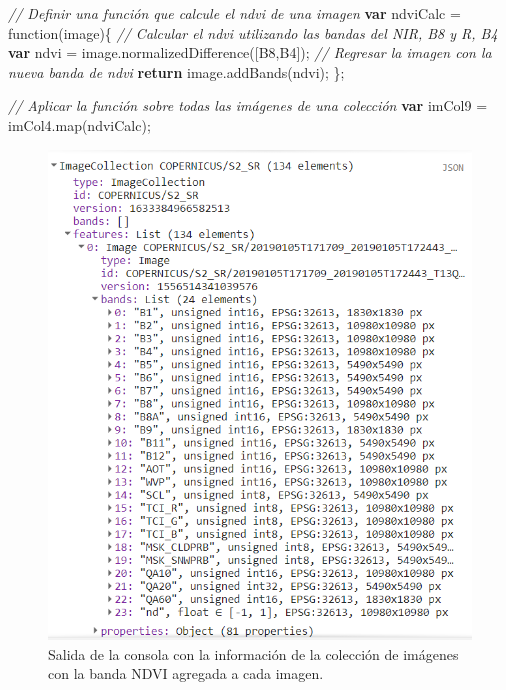 \documentclass[
  12pt,
  letterpaper,
  twoside]{book}
\newenvironment{Shaded}{\begin{snugshade}}{\end{snugshade}}
\newcommand{\CommentTok}[1]{\textcolor[rgb]{0.24,0.58,0.00}{\textit{#1}}}
\newcommand{\ControlFlowTok}[1]{\textcolor[rgb]{0.00,0.00,0.00}{\textbf{#1}}}
\newcommand{\FunctionTok}[1]{\textcolor[rgb]{0.48,0.12,0.64}{#1}}
\newcommand{\KeywordTok}[1]{\textcolor[rgb]{0.48,0.12,0.64}{#1}}
\newcommand{\NormalTok}[1]{#1}
\newcommand{\OperatorTok}[1]{\textcolor[rgb]{0.00,0.00,0.00}{#1}}
\newcommand{\StringTok}[1]{\textcolor[rgb]{0.87,0.29,0.22}{#1}}
\begin{document}
\begin{Shaded}
\begin{Highlighting}[]
\CommentTok{// Definir una función que calcule el ndvi de una imagen}
\ControlFlowTok{var}\NormalTok{ ndviCalc }\OperatorTok{=} \KeywordTok{function}\NormalTok{(image)\{}
  \CommentTok{// Calcular el ndvi utilizando las bandas del NIR, B8 y R, B4}
  \ControlFlowTok{var}\NormalTok{ ndvi }\OperatorTok{=}\NormalTok{ image}\OperatorTok{.}\FunctionTok{normalizedDifference}\NormalTok{([}\StringTok{\textquotesingle{}B8\textquotesingle{}}\OperatorTok{,}\StringTok{\textquotesingle{}B4\textquotesingle{}}\NormalTok{])}\OperatorTok{;}
  \CommentTok{// Regresar la imagen con la nueva banda de ndvi}
  \ControlFlowTok{return}\NormalTok{ image}\OperatorTok{.}\FunctionTok{addBands}\NormalTok{(ndvi)}\OperatorTok{;}
\NormalTok{\}}\OperatorTok{;}

\CommentTok{// Aplicar la función sobre todas las imágenes de una colección}
\ControlFlowTok{var}\NormalTok{ imCol9 }\OperatorTok{=}\NormalTok{ imCol4}\OperatorTok{.}\FunctionTok{map}\NormalTok{(ndviCalc)}\OperatorTok{;}
\end{Highlighting}
\end{Shaded}

\begin{figure}[H]

{\centering \includegraphics[width=0.8\linewidth]{Img/imcol9} 

}

\caption{Salida de la consola con la información de la colección de imágenes con la banda NDVI agregada a cada imagen.}\label{fig:f1011}
\end{figure}
\end{document}
